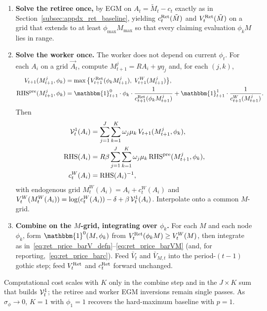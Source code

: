 \begin{enumerate}
	\item \textbf{Solve the retiree once,} by EGM on $A_t=\tilde M_t-c_t$ exactly as in Section~\ref{subsec:appdx_ret_baseline}, yielding $c_t^{\mathrm{Ret}}(\tilde M)$ and $V_t^{\mathrm{Ret}}(\tilde M)$ on a grid that extends to at least $\phi_{\max}M_{\max}$ so that every claiming evaluation $\phi_k M$ lies in range.
	\item \textbf{Solve the worker once.} The worker does not depend on current $\phi_t$. For each $A_i$ on a grid $\vec A_t$, compute $M_{t+1}^{j}=R A_i+y\eta_j$ and, for each $(j,k)$,
	\begin{align}
		V_{t+1}(M_{t+1}^{j},\phi_k)
		&= \max\big\{
			V_{t+1}^{\Ret}(\phi_k M_{t+1}^{j}),\;
			V_{t+1}^{W}(M_{t+1}^{j})
		\big\},
		\\
		\mathrm{RHS}^{\mathrm{pre}}(M_{t+1}^{j},\phi_k)
		&= \mathbbm{1}_{t+1}^{0}\cdot\phi_k\cdot\frac{1}{c_{t+1}^{\Ret}(\phi_k M_{t+1}^{j})}
		+\mathbbm{1}_{t+1}^{1}\cdot\frac{1}{c_{t+1}^{W}(M_{t+1}^{j})}.
	\end{align}
	Then
	\begin{align}
		\mathcal{V}_t^{1}(A_i)
		&= \sum_{j=1}^{J}\sum_{k=1}^{K}\omega_j\mu_k\,V_{t+1}(M_{t+1}^{j},\phi_k),
		\\
		\mathrm{RHS}(A_i)
		&= R\beta\sum_{j=1}^{J}\sum_{k=1}^{K}\omega_j\mu_k\,\mathrm{RHS}^{\mathrm{pre}}(M_{t+1}^{j},\phi_k),
		\\
		c_t^{W}(A_i)
		&= \mathrm{RHS}(A_i)^{-1},
	\end{align}
	with endogenous grid $M_t^{W}(A_i)=A_i+c_t^{W}(A_i)$ and
	$V_t^{W}(M_t^{W}(A_i))=\log(c_t^{W}(A_i))-\delta+\beta\,\mathcal{V}_t^{1}(A_i)$. Interpolate onto a common $M$-grid.
	\item \textbf{Combine on the $M$-grid, integrating over $\phi_k$.} For each $M$ and each node $\phi_k$, form $\mathbbm{1}^{0}(M,\phi_k)$ from $V_t^{\mathrm{Ret}}(\phi_k M)\ge V_t^{W}(M)$, then integrate as in~\eqref{eq:ret_price_barV_defn}--\eqref{eq:ret_price_barVM} (and, for reporting,~\eqref{eq:ret_price_barc}). Feed $\bar V_t$ and $\bar V_{M,t}$ into the period-$(t-1)$ gothic step; feed $V_t^{\mathrm{Ret}}$ and $c_t^{\mathrm{Ret}}$ forward unchanged.
\end{enumerate}
Computational cost scales with $K$ only in the combine step and in the $J\times K$ sum that builds $\mathcal{V}_t^{1}$; the retiree and worker EGM inversions remain single passes. As $\sigma_\phi\to 0$, $K=1$ with $\phi_1=1$ recovers the hard-maximum baseline with $p=1$.

